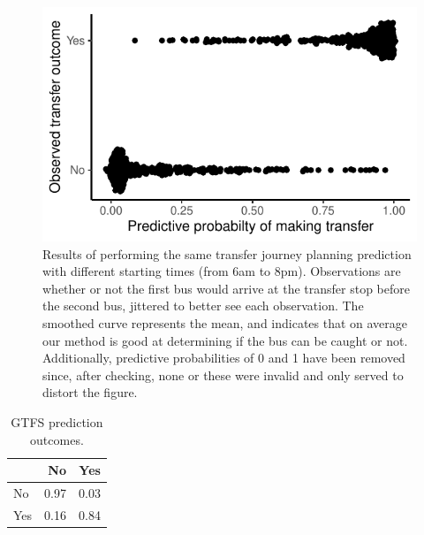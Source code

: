 \begin{knitrout}
\color{fgcolor}\begin{figure}

{\centering \includegraphics[width=\textwidth]{figure/eta_journey_transfer_many-1} 

}

\caption[Results of performing the same transfer journey planning prediction with different starting times (from 6am to 8pm)]{Results of performing the same transfer journey planning prediction with different starting times (from 6am to 8pm). Observations are whether or not the first bus would arrive at the transfer stop before the second bus, jittered to better see each observation. The smoothed curve represents the mean, and indicates that on average our method is good at determining if the bus can be caught or not. Additionally, predictive probabilities of 0 and 1 have been removed since, after checking, none or these were invalid and only served to distort the figure.}\label{fig:eta_journey_transfer_many}
\end{figure}

\begin{table}

\caption{\label{tab:eta_journey_transfer_many}GTFS prediction outcomes.}
\centering
\begin{tabular}[t]{lrr}
\toprule
  & No & Yes\\
\midrule
No & 0.97 & 0.03\\
Yes & 0.16 & 0.84\\
\bottomrule
\end{tabular}
\end{table}


\end{knitrout}

